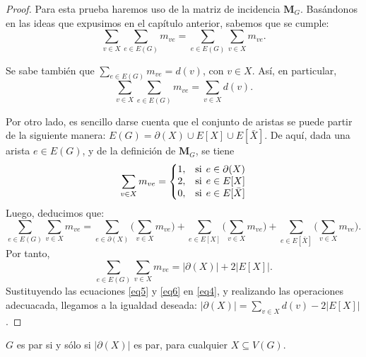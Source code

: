 \begin{proof} Para esta prueba haremos uso de la matriz de incidencia $\mathbf{M}_{G}$. Basándonos en las ideas que expusimos en el capítulo anterior, sabemos que se cumple:
\begin{equation} \label{eq4}
\sum_{v \in X} \sum_{e \in E(G)} m_{ve} = \sum_{e \in E(G)} \sum_{v \in X} m_{ve}.
\end{equation}

Se sabe también que $\sum_{e \in E(G)} m_{ve} = d(v)$, con $v \in X$. Así, en particular, 
\begin{equation} \label{eq5}
    \sum_{v \in X} \sum_{e \in E(G)} m_{ve} =\sum_{v \in X} d(v).
\end{equation}

Por otro lado, es sencillo darse cuenta que el conjunto de aristas se puede partir de la siguiente manera: $E(G)=\partial(X) \cup E[X] \cup E[\bar{X}]$. De aquí, dada una arista $e \in E(G)$, y de la definición de $\mathbf{M}_{G}$, se tiene
 $$
  \sum_{v \in X} m_{ve} = \left\{\begin{matrix}
1, & \text{si} \hspace{1.5mm} e \in \partial(X) \\ 
2, & \text{si} \hspace{1.5mm} e \in E[X]        \\
0, & \text{si} \hspace{1.5mm} e \in E[\bar{X}]
\end{matrix}\right.
 $$
 Luego, deducimos que:
  $$
  \sum_{e \in E(G)} \sum_{v \in X} m_{ve} = \sum_{e \in \partial(X)} \big( \sum_{v \in X} m_{ve} \big) + \sum_{e \in E[X]} \big(\sum_{v \in X} m_{ve}\big) + \sum_{e \in E[\bar{X}]} \big(\sum_{v \in X} m_{ve}\big).
  $$
  Por tanto, 
  \begin{equation} \label{eq6}
      \sum_{e \in E(G)} \sum_{v \in X} m_{ve} = \big| \partial(X) \big| + 2 \big| E[X] \big|.
  \end{equation}
  Sustituyendo las ecuaciones \ref{eq5} y \ref{eq6} en \ref{eq4}, y realizando las operaciones adecuacada, llegamos a la igualdad deseada: $\big|\partial(X)\big|= \sum _{v \in X} d(v)- 2 \big |E[X]\big |$.
  
  
\end{proof}




\begin{prop} \label{prop3}
$G$ es par si y sólo si $|\partial(X)|$ es par, para cualquier $X \subseteq V(G)$.
 
\end{prop}

